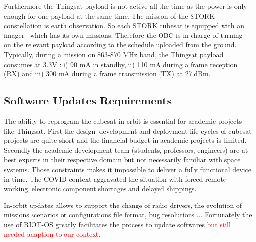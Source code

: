 Furthermore the Thingsat payload is not active all the time as the power is only
enough for one payload at the same time. The mission of the STORK constellation
is earth observation. So each STORK cubesat is equipped with an
imager~\cite{wiki:SatRevolution} which has its own missions. Therefore the OBC
is in charge of turning on the relevant payload according to the schedule
uploaded from the ground. Typically, during a mission on 863-870 MHz band, the
Thingsat payload consumes at 3.3V : i) 90 mA in standby, ii) 110 mA during a frame
reception (RX) and iii) 300 mA during a frame transmission (TX) at 27 dBm.

\subsection{Software Updates Requirements}


The ability to reprogram the cubesat in orbit is essential for academic projects
like Thingsat. First the design, development and deployment life-cycles of
cubesat projects are quite short and the financial budget in academic projects
is limited. Secondly the academic development team (students, professors,
engineers) are at best experts in their respective domain but not necessarily
familiar with space systems. Those constraints makes it impossible to
deliver a fully functional device in time. The COVID context aggravated the
situation with forced remote working, electronic component shortages and delayed
shippings. 


In-orbit updates allows to support the change of radio drivers, the evolution of
missions scenarios or configurations file format, bug resolutions ...
Fortunately the use of RIOT-OS greatly facilitates the process to update
softwares \textcolor{red}{but still needed adaption to our context}.

